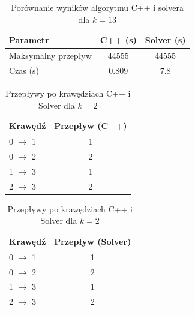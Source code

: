 \documentclass{article}
\begin{document}
\begin{table}[H]
\centering
\caption{Porównanie wyników algorytmu C++ i solvera dla $k=13$}
\begin{tabular}{lcc}
\toprule
Parametr                   & C++ (s) & Solver (s) \\
\midrule
Maksymalny przepływ       &  44555     &  44555   \\
Czas (s)                     & 0.809    & 7.8    \\
\bottomrule
\end{tabular}
\end{table}

\begin{table}[h]
\centering
\caption{Przepływy po krawędziach C++ i Solver dla $k=2$}
\begin{minipage}{0.45\textwidth}
\centering
\begin{tabular}{|l|c|}
\hline
Krawędź                   & Przepływ (C++) \\
\hline
0 $\to$ 1 & 1\\
0 $\to$ 2& 2\\
1 $\to$ 3& 1\\
2 $\to$ 3& 2\\
\hline
\end{tabular}
\end{minipage}
\hfill
\begin{minipage}{0.45\textwidth}
\centering
\begin{tabular}{|l|c|}
\hline
Krawędź                   & Przepływ (Solver) \\
\hline
0 $\to$ 1 & 1\\
0 $\to$ 2& 2\\
1 $\to$ 3& 1\\
2 $\to$ 3& 2\\
\hline
\end{tabular}
\end{minipage}
\end{table}
\end{document}
